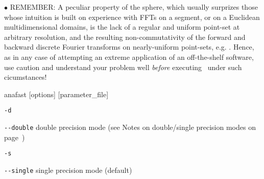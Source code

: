 \begin{recommend}
{$\bullet$ REMEMBER: 
A peculiar property of the sphere, which usually surprizes those 
whose intuition is built on experience with FFTs on a segment, or 
on a Euclidean multidimensional domains, is the lack of 
a regular and uniform point-set at arbitrary resolution, 
and the resulting non-commutativity of the forward and
backward discrete Fourier transforms on nearly-uniform point-sets,
e.g. {\healpix}. Hence,
as in any case of attempting an extreme application of an off-the-shelf
software, use caution and understand your problem well {\it before}
executing \thedocid\ under such cicumstances!
}
\end{recommend}

\begin{f90facility}
{anafast [options] [parameter\_file]}
\end{f90facility}

\begin{options}
  \begin{optionlistwide}{} %
    \item[{\tt -d}]
    \item[{\tt -}{\tt -}{\tt double}] double precision mode (see Notes on double/single precision modes on page~\pageref{page:ioprec})
    \item[{\tt -s}]
    \item[{\tt -}{\tt -}{\tt single}] single precision mode (default)
  \end{optionlistwide}
\end{options}

